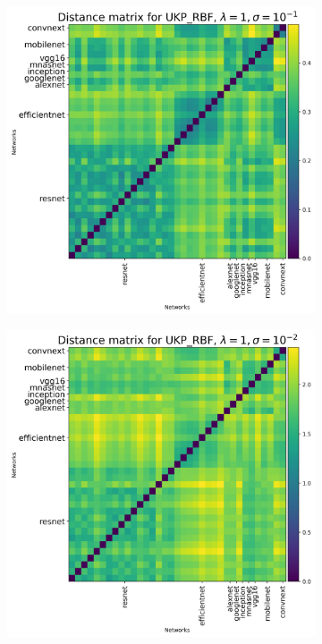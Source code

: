 \documentclass{article}
\theoremstyle{plain}
\begin{document}
\begin{figure}[!h]
    \centering
    \begin{subfigure}[b]{0.3\textwidth}
        \includegraphics[width=\textwidth]{Appendix figures/imagenet_experiments/Heatmaps final/Heatmap for UKP_dist_RBF_1.000000e+00_1.000000e-01.png}
    \end{subfigure}
    \hfill
    \begin{subfigure}[b]{0.3\textwidth}
        \includegraphics[width=\textwidth]{Appendix figures/imagenet_experiments/Heatmaps final/Heatmap for UKP_dist_RBF_1.000000e+00_1.000000e-02.png}

\end{subfigure}
\end{figure}
\end{document}
